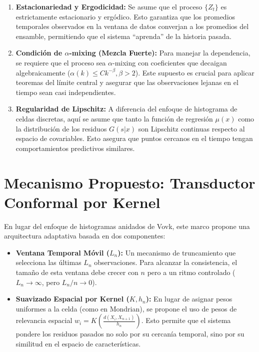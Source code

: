 \begin{enumerate}
    \item \textbf{Estacionariedad y Ergodicidad:} Se asume que el proceso $\{Z_t\}$ es estrictamente estacionario y ergódico. Esto garantiza que los promedios temporales observados en la ventana de datos converjan a los promedios del ensamble, permitiendo que el sistema ``aprenda'' de la historia pasada.
    
    \item \textbf{Condición de $\alpha$-mixing (Mezcla Fuerte):} Para manejar la dependencia, se requiere que el proceso sea $\alpha$-mixing con coeficientes que decaigan algebraicamente ($\alpha(k) \leq Ck^{-\beta}, \beta > 2$). Este supuesto es crucial para aplicar teoremas del límite central y asegurar que las observaciones lejanas en el tiempo sean casi independientes.
    
    \item \textbf{Regularidad de Lipschitz:} A diferencia del enfoque de histograma de celdas discretas, aquí se asume que tanto la función de regresión $\mu(x)$ como la distribución de los residuos $G(s|x)$ son Lipschitz continuas respecto al espacio de covariables. Esto asegura que puntos cercanos en el tiempo tengan comportamientos predictivos similares.
\end{enumerate}

\section{Mecanismo Propuesto: Transductor Conformal por Kernel}

En lugar del enfoque de histogramas anidados de Vovk, este marco propone una arquitectura adaptativa basada en dos componentes:

\begin{itemize}
    \item \textbf{Ventana Temporal Móvil ($L_n$):} Un mecanismo de truncamiento que selecciona las últimas $L_n$ observaciones. Para alcanzar la consistencia, el tamaño de esta ventana debe crecer con $n$ pero a un ritmo controlado ($L_n \to \infty$, pero $L_n/n \to 0$).
    \item \textbf{Suavizado Espacial por Kernel ($K, h_n$):} En lugar de asignar pesos uniformes a la celda (como en Mondrian), se propone el uso de pesos de relevancia espacial $w_i = K\left(\frac{d(X_i, X_{n+1})}{h_n}\right)$. Esto permite que el sistema pondere los residuos pasados no solo por su cercanía temporal, sino por su similitud en el espacio de características.
\end{itemize}

